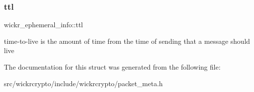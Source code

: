 \subsubsection{\texorpdfstring{ttl}{ttl}}
{\footnotesize\ttfamily wickr\+\_\+ephemeral\+\_\+info\+::ttl}

time-\/to-\/live is the amount of time from the time of sending that a message should live 

The documentation for this struct was generated from the following file\+:\begin{DoxyCompactItemize}
\item 
src/wickrcrypto/include/wickrcrypto/packet\+\_\+meta.\+h\end{DoxyCompactItemize}
